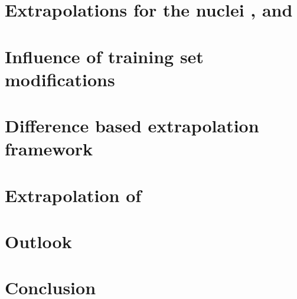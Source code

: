 \chapter{Extrapolations for the nuclei ,  and }
\label{chap:reproduction}


\chapter{Influence of training set modifications}
\label{chap:extended}


\chapter{Difference based extrapolation framework}
\label{chap:diff}


\chapter{Extrapolation of }
\label{chap:li6}


\chapter{Outlook}
\label{chap:outlook}


\chapter{Conclusion}
\label{chap:conclusion}



\printbibliography

